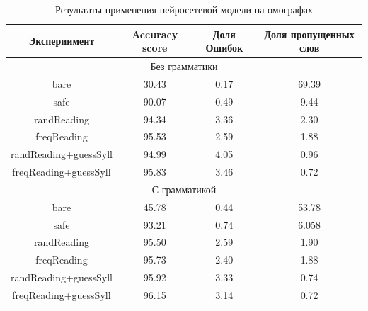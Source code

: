 \documentclass[14pt, a4paper, russian]{extreport}
\begin{document}
\begin{table}[H]
		\caption{Результаты применения нейросетевой модели на омографах}
	
	\begin{small}
		\begin{center}
			\begin{tabular}{|c|c|c|c|}
				\hline
				    Экспериимент      & Accuracy score & Доля Ошибок & Доля пропущенных слов \\ \hline
				\multicolumn{4}{|c|}{Без грамматики}                                         \\ \hline
				        bare          &     30.43      &    0.17     &         69.39         \\ \hline
				        safe          &     90.07      &    0.49     &         9.44          \\ \hline
				     randReading      &     94.34      &    3.36     &         2.30          \\ \hline
				     freqReading      &     95.53      &    2.59     &         1.88          \\ \hline
				randReading+guessSyll &     94.99      &    4.05     &         0.96          \\ \hline
				freqReading+guessSyll &     95.83      &    3.46     &         0.72          \\ \hline
				\multicolumn{4}{|c|}{С грамматикой}                                          \\ \hline
				        bare          &     45.78      &    0.44     &         53.78         \\ \hline
				        safe          &     93.21      &    0.74     &         6.058         \\ \hline
				     randReading      &     95.50      &    2.59     &         1.90          \\ \hline
				     freqReading      &     95.73      &    2.40     &         1.88          \\ \hline
				randReading+guessSyll &     95.92      &    3.33     &         0.74          \\ \hline
				freqReading+guessSyll &     96.15      &    3.14     &         0.72          \\ \hline
			\end{tabular}
		\end{center}
	\end{small}
	\label{table:base_homo}
\end{table}
\end{document}
